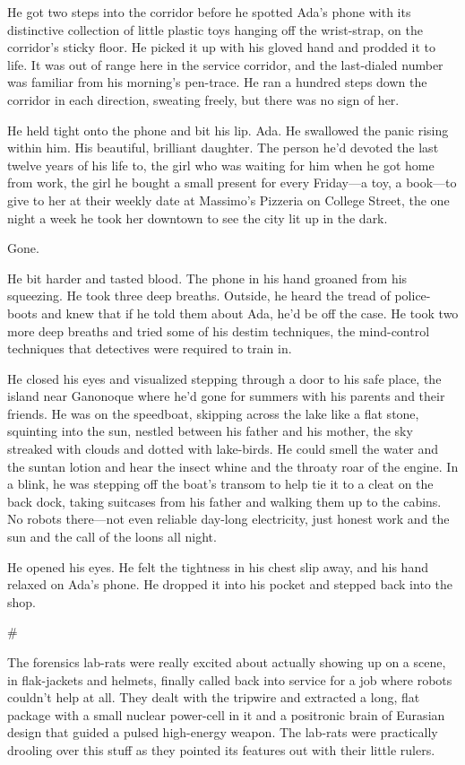 He got two steps into the corridor before he spotted Ada’s phone
with its distinctive collection of little plastic toys hanging off
the wrist-strap, on the corridor’s sticky floor. He picked it up
with his gloved hand and prodded it to life. It was out of range
here in the service corridor, and the last-dialed number was
familiar from his morning’s pen-trace. He ran a hundred steps down
the corridor in each direction, sweating freely, but there was no
sign of her.

He held tight onto the phone and bit his lip. Ada. He swallowed the
panic rising within him. His beautiful, brilliant daughter. The
person he’d devoted the last twelve years of his life to, the girl
who was waiting for him when he got home from work, the girl he
bought a small present for every Friday—a toy, a book—to give to
her at their weekly date at Massimo’s Pizzeria on College Street,
the one night a week he took her downtown to see the city lit up in
the dark.

Gone.

He bit harder and tasted blood. The phone in his hand groaned from
his squeezing. He took three deep breaths. Outside, he heard the
tread of police-boots and knew that if he told them about Ada, he’d
be off the case. He took two more deep breaths and tried some of
his destim techniques, the mind-control techniques that detectives
were required to train in.

He closed his eyes and visualized stepping through a door to his
safe place, the island near Ganonoque where he’d gone for summers
with his parents and their friends. He was on the speedboat,
skipping across the lake like a flat stone, squinting into the sun,
nestled between his father and his mother, the sky streaked with
clouds and dotted with lake-birds. He could smell the water and the
suntan lotion and hear the insect whine and the throaty roar of the
engine. In a blink, he was stepping off the boat’s transom to help
tie it to a cleat on the back dock, taking suitcases from his
father and walking them up to the cabins. No robots there—not even
reliable day-long electricity, just honest work and the sun and the
call of the loons all night.

He opened his eyes. He felt the tightness in his chest slip away,
and his hand relaxed on Ada’s phone. He dropped it into his pocket
and stepped back into the shop.

\#

The forensics lab-rats were really excited about actually showing
up on a scene, in flak-jackets and helmets, finally called back
into service for a job where robots couldn’t help at all. They
dealt with the tripwire and extracted a long, flat package with a
small nuclear power-cell in it and a positronic brain of Eurasian
design that guided a pulsed high-energy weapon. The lab-rats were
practically drooling over this stuff as they pointed its features
out with their little rulers.

